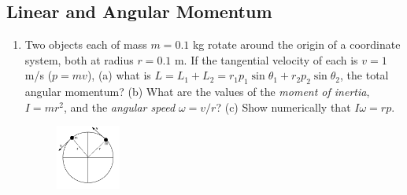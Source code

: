 \documentclass[10pt]{article}
\begin{document}
\subsection{Linear and Angular Momentum}
\begin{enumerate}
\item Two objects each of mass $m = 0.1$ kg rotate around the origin of a coordinate system, both at radius $r = 0.1$ m.  If the tangential velocity of each is $v = 1$ m/s ($p = mv$), (a) what is $L = L_1 + L_2 = r_1 p_1\sin\theta_1+r_2 p_2\sin\theta_2$, the total angular momentum?  (b) What are the values of the \textit{moment of inertia}, $I = mr^2$, and the \textit{angular speed} $\omega = v/r$?  (c) Show numerically that $I\omega = rp$.
\begin{figure}[hb]
\centering
\includegraphics[width=0.2\textwidth]{rotate.pdf}
\end{figure}
\end{enumerate}
\end{document}
